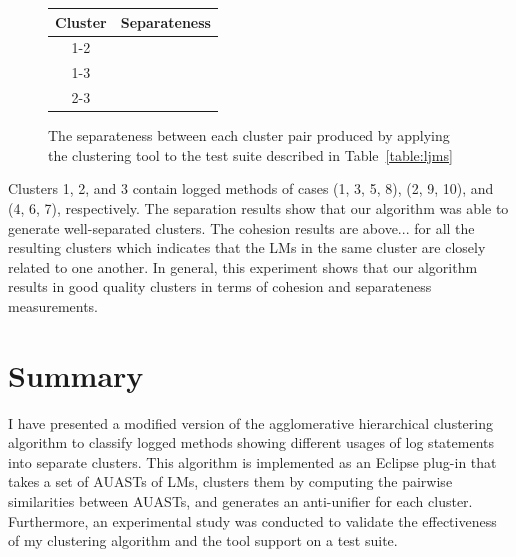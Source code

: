 \begin{figure} [H]
  \centering
  \begin{tabular}{cc}
    \toprule
    {Cluster}&{Separateness}\\
    \midrule
    1-2& \\
    \midrule
    1-3& \\
    \midrule
    2-3& \\
 	\bottomrule
  \end{tabular}
  \caption{The separateness between each cluster pair produced by applying the clustering tool to the test suite described in Table~\ref{table:ljms}}
  \label{results_clustering_separateness}
\end{figure}

Clusters 1, 2, and 3 contain logged methods of cases (1, 3, 5, 8), (2, 9, 10), and (4, 6, 7), respectively. 
The separation results show that our algorithm was able to generate well-separated clusters.
The cohesion results are above...  for all the resulting clusters which indicates that the LMs in the same cluster are closely related to one another. In general, this experiment shows that our algorithm results in good quality clusters in terms of cohesion and separateness measurements.



\section{Summary} \label{meth2-summary}
I have presented a modified version of the agglomerative hierarchical clustering algorithm to classify logged methods showing different usages of log statements into separate clusters. This algorithm is implemented as an Eclipse plug-in that takes a set of AUASTs of LMs, clusters them by computing the pairwise similarities between AUASTs, and generates an anti-unifier for each cluster. Furthermore, an experimental study was conducted to validate the effectiveness of my clustering algorithm and the tool support on a test suite.




